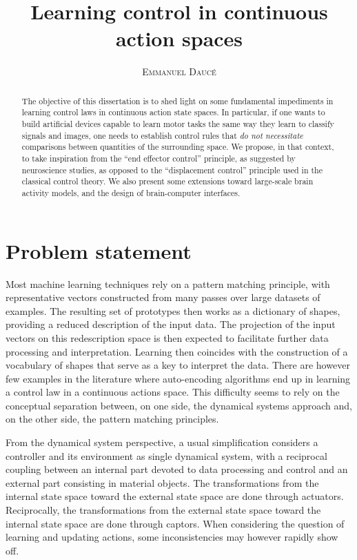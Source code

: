 \documentclass[11pt]{article}
\title{\Huge \textbf{Learning control in continuous action spaces} }
\author{\textsc{Emmanuel Daucé}}%
\begin{document}
\maketitle
\begin{abstract}




The objective  of this dissertation is to shed light on some fundamental impediments 
in learning control laws in continuous action state spaces. 
In particular, if one wants to build artificial devices capable to learn motor tasks
the same way they learn to classify signals and images, 
one needs to establish control rules that \textit{do not necessitate} comparisons between quantities
of the surrounding space.
We propose, in that context, to
take inspiration from the ``end effector control'' principle, as suggested by neuroscience studies,  
as opposed to the ``displacement control'' principle used in the classical control theory. 
We also present some extensions toward large-scale 
brain activity models, and the design of brain-computer interfaces.

\end{abstract}

\section{Problem statement}

Most machine learning techniques rely on a pattern matching principle, with representative vectors constructed from many passes over large datasets of examples.
The resulting set of prototypes then works as a dictionary of shapes, providing a reduced description of the input data. The projection of the input vectors on this redescription space is then expected to facilitate further data processing and interpretation.
Learning then coincides with the construction of a vocabulary of shapes that serve as a key to interpret the data. 
There are however few examples in the literature where auto-encoding algorithms end up in learning a control law in a continuous actions space.  
This difficulty seems to rely on the conceptual separation between, on one side, the dynamical systems approach and, on the other side, the pattern matching principles.

From the dynamical system perspective, a usual simplification considers a controller and its environment as single dynamical system, with a reciprocal coupling between an internal part devoted to data processing and control and an external part consisting in material objects. The transformations from the internal state space toward the external state space are done through actuators. Reciprocally, the transformations from the external state space toward the internal state space are done through captors. 
When considering the question of learning and updating actions, some inconsistencies may however rapidly show off. 
\end{document}
